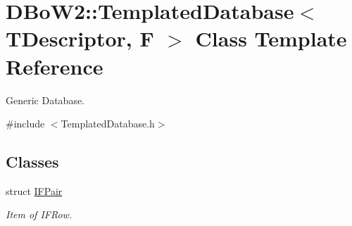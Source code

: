 \hypertarget{classDBoW2_1_1TemplatedDatabase}{}\section{D\+Bo\+W2\+:\+:Templated\+Database$<$ T\+Descriptor, F $>$ Class Template Reference}
\label{classDBoW2_1_1TemplatedDatabase}


Generic Database.  




{\ttfamily \#include $<$Templated\+Database.\+h$>$}

\subsection*{Classes}
\begin{DoxyCompactItemize}
\item 
struct \hyperlink{structDBoW2_1_1TemplatedDatabase_1_1IFPair}{I\+F\+Pair}
\begin{DoxyCompactList}\small\item\em Item of I\+F\+Row. \end{DoxyCompactList}\end{DoxyCompactItemize}
